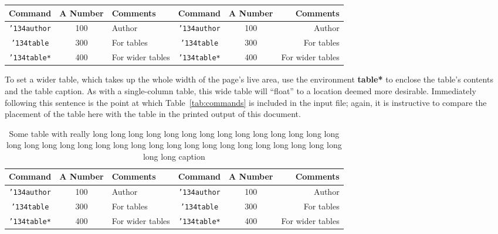 \begin{table*}[h]
	\caption{Some Typical Commands}
	\label{tab:commands}
	\centering
	\begin{tabular}{cclccr}
		\toprule
		Command                    & A Number & Comments         & Command                    & A Number & Comments         \\
		\midrule
		\texttt{{\char'134}author} & 100      & Author           & \texttt{{\char'134}author} & 100      & Author           \\
		\texttt{{\char'134}table}  & 300      & For tables       & \texttt{{\char'134}table}  & 300      & For tables       \\
		\texttt{{\char'134}table*} & 400      & For wider tables & \texttt{{\char'134}table*} & 400      & For wider tables \\
		\bottomrule
	\end{tabular}
\end{table*}

To set a wider table, which takes up the whole width of the page's
live area, use the environment \textbf{table*} to enclose the table's
contents and the table caption. As with a single-column table, this
wide table will ``float'' to a location deemed more
desirable. Immediately following this sentence is the point at which
Table~\ref{tab:commands} is included in the input file; again, it is
instructive to compare the placement of the table here with the table
in the printed output of this document.
\begin{table}[h]
	\caption{Some table with really long long long long long long long long long long long long long long long long long long long long long long long long long long long long long long long long long long long caption}
	\label{tab:commandsnostar}
	\centering
	\begin{tabular}{cclccr}
		\toprule
		Command                    & A Number & Comments         & Command                    & A Number & Comments         \\
		\midrule
		\texttt{{\char'134}author} & 100      & Author           & \texttt{{\char'134}author} & 100      & Author           \\
		\texttt{{\char'134}table}  & 300      & For tables       & \texttt{{\char'134}table}  & 300      & For tables       \\
		\texttt{{\char'134}table*} & 400      & For wider tables & \texttt{{\char'134}table*} & 400      & For wider tables \\
		\bottomrule
	\end{tabular}
\end{table}



